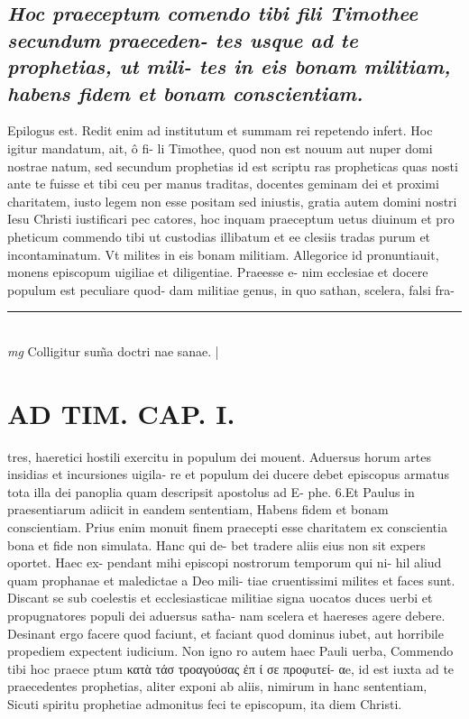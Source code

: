 \documentclass{article}
\begin{document}
\begin{pages}
\subsection*{\textit{Hoc praeceptum comendo tibi fili Timothee secundum praeceden- tes usque ad te prophetias, ut mili- tes in eis bonam militiam, habens fidem et bonam conscientiam. }}\pstart Epilogus est. Redit enim ad institutum et summam rei repetendo infert. Hoc igitur mandatum, ait, ô fi- li Timothee, quod non est nouum aut nuper domi nostrae natum, sed secundum prophetias id est scriptu ras propheticas quas nosti ante te fuisse et tibi ceu per manus traditas, docentes geminam dei et proximi charitatem, iusto legem non esse positam sed iniustis, gratia autem domini nostri Iesu Christi iustificari pec catores, hoc inquam praeceptum uetus diuinum et pro pheticum commendo tibi ut custodias illibatum et ee clesiis tradas purum et incontaminatum. Vt milites in eis bonam militiam. Allegorice id pronuntiauit, monens episcopum uigiliae et diligentiae. Praeesse e- nim ecclesiae et docere populum est peculiare quod- dam militiae genus, in quo sathan, scelera, falsi fra-  \pend
\vspace{0.5cm}\noindent
\vspace{0.2cm}\rule{1cm}{0.2pt}\\ 
\hspace{0.2cm}\textit{mg}
\footnotesize Colligitur sum̃a doctri nae sanae. 
\normalsize| 
\section*{AD TIM. CAP. I. }
\marginpar{[ p.107 ]}\pstart tres, haeretici hostili exercitu in populum dei mouent. Aduersus horum artes insidias et incursiones uigila- re et populum dei ducere debet episcopus armatus tota illa dei panoplia quam descripsit apostolus ad E- phe. 6.Et Paulus in praesentiarum adiicit in eandem sententiam, Habens fidem et bonam conscientiam. Prius enim monuit finem praecepti esse charitatem ex conscientia bona et fide non simulata. Hanc qui de- bet tradere aliis eius non sit expers oportet. Haec ex- pendant mihi episcopi nostrorum temporum qui ni- hil aliud quam prophanae et maledictae a Deo mili- tiae cruentissimi milites et faces sunt. Discant se sub coelestis et ecclesiasticae militiae signa uocatos duces uerbi et propugnatores populi dei aduersus satha- nam scelera et haereses agere debere. Desinant ergo facere quod faciunt, et faciant quod dominus iubet, aut horribile propediem expectent iudicium. Non igno ro autem haec Pauli uerba, Commendo tibi hoc praece ptum κατὰ τάσ τροαγούσας ἐπ ί σε προφuτεί- αe, id est iuxta ad te praecedentes prophetias, aliter exponi ab aliis, nimirum in hanc sententiam, Sicuti spiritu prophetiae admonitus feci te episcopum, ita diem Christi.  \pend

\end{pages}
\end{document}
